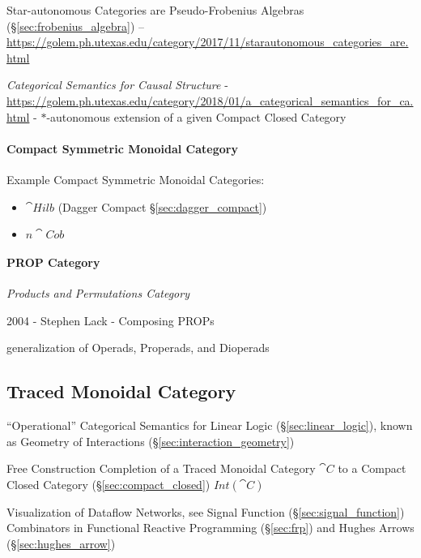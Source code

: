 Star-autonomous Categories are Pseudo-Frobenius Algebras
(\S\ref{sec:frobenius_algebra})
--\url{https://golem.ph.utexas.edu/category/2017/11/starautonomous_categories_are.html}

\emph{Categorical Semantics for Causal Structure} -
\url{https://golem.ph.utexas.edu/category/2018/01/a_categorical_semantics_for_ca.html}
- $*$-autonomous extension of a given Compact Closed Category



\paragraph{Compact Symmetric Monoidal Category}
\label{sec:compact_symmetric_monoidal}\hfill

Example Compact Symmetric Monoidal Categories:

\begin{itemize}
\item $\cat{Hilb}$ (Dagger Compact \S\ref{sec:dagger_compact})
\item $n\cat{Cob}$
\end{itemize}



\paragraph{PROP Category}\label{sec:prop_category}\hfill

\emph{Products and Permutations Category}

2004 - Stephen Lack - Composing PROPs

generalization of Operads, Properads, and Dioperads



\subsection{Traced Monoidal Category}\label{sec:traced_monoidal}

``Operational'' Categorical Semantics for Linear Logic
(\S\ref{sec:linear_logic}), known as Geometry of Interactions
(\S\ref{sec:interaction_geometry})

Free Construction Completion of a Traced Monoidal Category $\cat{C}$
to a Compact Closed Category (\S\ref{sec:compact_closed})
$Int(\cat{C})$

Visualization of Dataflow Networks, see Signal Function
(\S\ref{sec:signal_function}) Combinators in Functional Reactive
Programming (\S\ref{sec:frp}) and Hughes Arrows
(\S\ref{sec:hughes_arrow})

